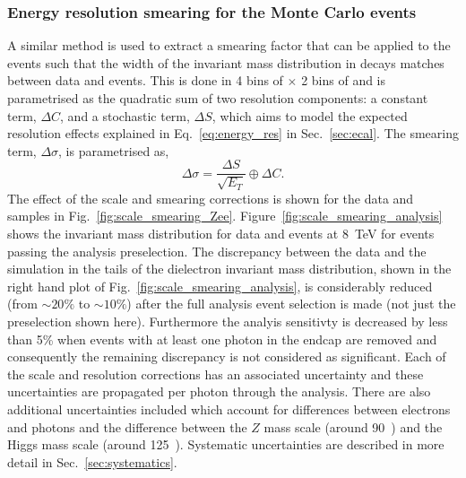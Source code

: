 \subsubsection{Energy resolution smearing for the Monte Carlo events}

A similar method is used to extract a smearing factor that can be applied to the \MC events such that the width of the invariant mass distribution in \Zee decays matches between data and \MC events. This is done in 4 bins of \eta $\times$ 2 bins of \rnine and is parametrised as the quadratic sum of two resolution components: a constant term, $\Delta C$, and a stochastic term, $\Delta S$, which aims to model the expected resolution effects explained in Eq.~\ref{eq:energy_res} in Sec.~\ref{sec:ecal}. The smearing term, $\Delta\sigma$, is parametrised as,
\begin{equation}
  \Delta\sigma = \frac{\Delta S}{\sqrt{E_{T}}} \oplus \Delta C.
\end{equation}
The effect of the scale and smearing corrections is shown for the \Zee data and \MC samples in Fig.~\ref{fig:scale_smearing_Zee}. Figure~\ref{fig:scale_smearing_analysis} shows the \Zee invariant mass distribution for data and \MC events at 8~TeV for events passing the analysis preselection. The discrepancy between the data and the \MC simulation in the tails of the dielectron invariant mass distribution, shown in the right hand plot of Fig.~\ref{fig:scale_smearing_analysis}, is considerably reduced (from $\sim20\%$ to $\sim10\%$) after the full analysis event selection is made (not just the preselection shown here). Furthermore the analyis sensitivty is decreased by less than 5\% when events with at least one photon in the endcap are removed and consequently the remaining discrepancy is not considered as significant. Each of the scale and resolution corrections has an associated uncertainty and these uncertainties are propagated per photon through the analysis. There are also additional uncertainties included which account for differences between electrons and photons and the difference between the $Z$ mass scale (around 90~\GeV) and the Higgs mass scale (around 125~\GeV). Systematic uncertainties are described in more detail in Sec.~\ref{sec:systematics}.

